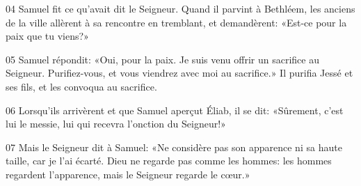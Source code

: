 
04 Samuel fit ce qu’avait dit le Seigneur. Quand il parvint à Bethléem, les anciens de la ville allèrent à sa rencontre en tremblant, et demandèrent: «Est-ce pour la paix que tu viens?»

05 Samuel répondit: «Oui, pour la paix. Je suis venu offrir un sacrifice au Seigneur. Purifiez-vous, et vous viendrez avec moi au sacrifice.» Il purifia Jessé et ses fils, et les convoqua au sacrifice.

06 Lorsqu’ils arrivèrent et que Samuel aperçut Éliab, il se dit: «Sûrement, c’est lui le messie, lui qui recevra l’onction du Seigneur!»

07 Mais le Seigneur dit à Samuel: «Ne considère pas son apparence ni sa haute taille, car je l’ai écarté. Dieu ne regarde pas comme les hommes: les hommes regardent l’apparence, mais le Seigneur regarde le cœur.»
